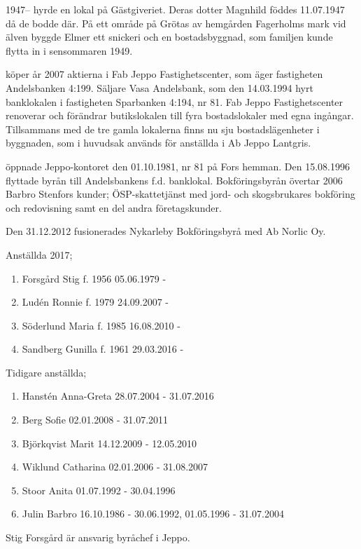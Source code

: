 1947-- hyrde  en lokal på Gästgiveriet. Deras dotter Magnhild föddes 11.07.1947 då de bodde där.	På ett område på Grötas av hemgården Fagerholms mark vid älven 	byggde Elmer ett snickeri och en bostadsbyggnad, som familjen kunde flytta in i sensommaren 1949.




 köper år 2007 aktierna i Fab Jeppo Fastighetscenter, som äger fastigheten Andelsbanken 4:199.	Säljare Vasa Andelsbank, som den 14.03.1994 hyrt banklokalen i fastigheten Sparbanken 4:194, nr 81. Fab Jeppo Fastighetscenter renoverar och förändrar butikslokalen till fyra bostadslokaler med egna ingångar. Tillsammans med de tre gamla lokalerna finns nu sju bostadslägenheter i byggnaden, som i huvudsak används för anställda i Ab Jeppo Lantgris.


 öppnade Jeppo-kontoret den 01.10.1981, nr 81 på Fors hemman. Den 15.08.1996 flyttade byrån till Andelsbankens f.d. banklokal. Bokföringsbyrån övertar 2006 Barbro Stenfors kunder; ÖSP-skattetjänst med jord- och skogsbrukares bokföring och redovisning samt en del andra företagskunder.

Den 31.12.2012 fusionerades Nykarleby Bokföringsbyrå med Ab Norlic Oy.


Anställda 2017;
\begin{enumerate}
  \item Forsgård Stig     f. 1956   05.06.1979 -
  \item Ludén Ronnie      f. 1979	  24.09.2007 -
  \item Söderlund Maria   f. 1985	  16.08.2010 -
  \item Sandberg Gunilla  f. 1961	  29.03.2016 -
\end{enumerate}

Tidigare anställda;
\begin{enumerate}
  \item Hanstén Anna-Greta    28.07.2004 - 31.07.2016
  \item Berg Sofie            02.01.2008 - 31.07.2011
  \item Björkqvist Marit      14.12.2009 - 12.05.2010
  \item Wiklund Catharina     02.01.2006 - 31.08.2007
  \item Stoor Anita           01.07.1992 - 30.04.1996
  \item Julin Barbro          16.10.1986 - 30.06.1992, 01.05.1996 - 31.07.2004
\end{enumerate}
Stig Forsgård är ansvarig byråchef i Jeppo.


